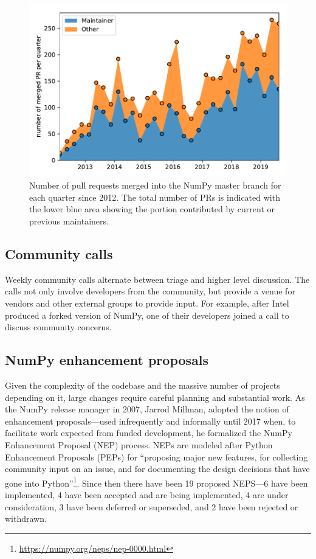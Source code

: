 \begin{figure}
    \centering
    \includegraphics[width=0.9\linewidth]{scripts/PRs-using-CURRENT_MAINTAINERS.pdf}
    \caption{Number of pull requests merged into the NumPy master branch for each
        quarter since 2012. The total number of PRs is indicated with the
        lower blue area showing the portion contributed by current or previous
        maintainers.}\label{fig:prs-over-time}
\end{figure}



\subsection*{Community calls}

Weekly community calls alternate between triage and
higher level discussion.  The calls not only involve developers from
the community, but provide a venue for vendors and other external
groups to provide input.  For example, after Intel produced a forked
version of NumPy, one of their developers joined a call to discuss
community concerns.

\subsection*{NumPy enhancement proposals}

Given the complexity of the codebase and the massive number of projects depending
on it, large changes require careful planning and substantial work.
As the NumPy release manager in 2007, Jarrod Millman, adopted the notion
of enhancement proposals---used infrequently and informally until 2017 when,
to facilitate work expected from funded development, he formalized the
NumPy Enhancement Proposal (NEP) process.  NEPs are modeled after
Python Enhancement Proposals (PEPs) for ``proposing major new
features, for collecting community input on an issue, and for
documenting the design decisions that have gone into
Python''\footnote{\url{https://numpy.org/neps/nep-0000.html}}.
Since then there have been 19 proposed NEPS---6 have been implemented,
4 have been accepted and are being implemented, 4 are under
consideration, 3 have been deferred or superseded, and 2 have been rejected
or withdrawn.


